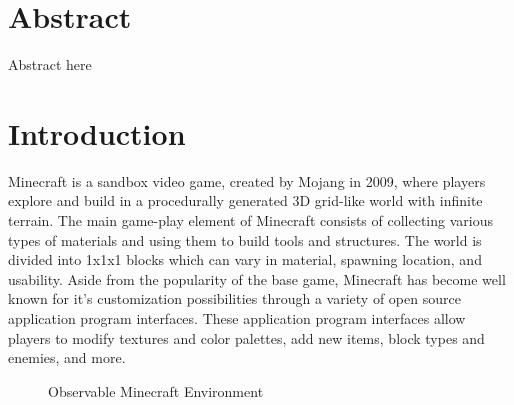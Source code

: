 \documentclass[11pt, oneside]{article}
\begin{document}
\begin{normalsize}

\section{Abstract}
\label{Abstract}

Abstract here

\newpage

\section{Introduction}
\label{Introduction}

	Minecraft is a sandbox video game, created by Mojang in 2009, where players explore and build in a procedurally generated 3D grid-like world with infinite terrain. The main game-play element of Minecraft consists of collecting various types of materials and using them to build tools and structures. The world is divided into 1x1x1 blocks which can vary in material, spawning location, and usability. Aside from the popularity of the base game, Minecraft has become well known for it's customization possibilities through a variety of open source application program interfaces. These application program interfaces allow players to modify textures and color palettes, add new items, block types and enemies, and more. 
	
\begin{figure}[H]%
    \centering
    \qquad
    \caption{Observable Minecraft Environment}%
    \label{fig:Observable Minecraft Environment}%
\end{figure}


\end{normalsize}
\end{document}
